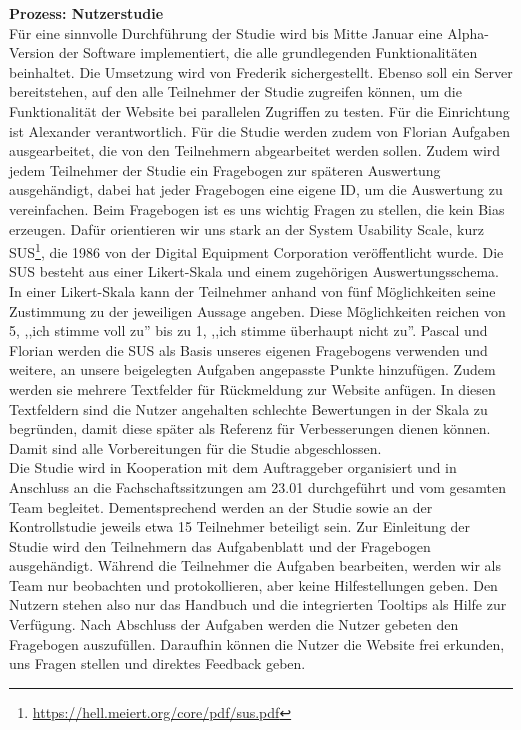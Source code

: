 \documentclass[accentcolor=tud0b,12pt,paper=a4]{tudreport}
\begin{document}
\noindent \textbf{Prozess: Nutzerstudie}\\
Für eine sinnvolle Durchführung der Studie wird bis Mitte Januar eine Alpha-Version der Software implementiert, die alle grundlegenden Funktionalitäten beinhaltet. Die Umsetzung wird von Frederik sichergestellt.
Ebenso soll ein Server bereitstehen, auf den alle Teilnehmer der Studie zugreifen können, um die Funktionalität der Website bei parallelen Zugriffen zu testen. Für die Einrichtung ist Alexander verantwortlich.
Für die Studie werden zudem von Florian Aufgaben ausgearbeitet, die von den Teilnehmern abgearbeitet werden sollen.
Zudem wird jedem Teilnehmer der Studie ein Fragebogen zur späteren Auswertung ausgehändigt, dabei hat jeder Fragebogen eine eigene ID, um die Auswertung zu vereinfachen.
Beim Fragebogen ist es uns wichtig Fragen zu stellen, die kein Bias erzeugen. Dafür orientieren wir uns stark an der System Usability Scale, kurz SUS\footnote{\url{https://hell.meiert.org/core/pdf/sus.pdf}}, die 1986 von der Digital Equipment Corporation veröffentlicht wurde.
Die SUS besteht aus einer Likert-Skala und einem zugehörigen Auswertungsschema. In einer Likert-Skala kann der Teilnehmer anhand von fünf Möglichkeiten seine Zustimmung zu der jeweiligen Aussage angeben.
Diese Möglichkeiten reichen von 5, ,,ich stimme voll zu'' bis zu 1, ,,ich stimme überhaupt nicht zu''.
Pascal und Florian werden die SUS als Basis unseres eigenen Fragebogens verwenden und weitere, an unsere beigelegten Aufgaben angepasste Punkte hinzufügen.
Zudem werden sie mehrere Textfelder für Rückmeldung zur Website anfügen.  In diesen Textfeldern sind die Nutzer angehalten schlechte Bewertungen in der Skala zu begründen, damit diese später als Referenz für Verbesserungen dienen können.
Damit sind alle Vorbereitungen für die Studie abgeschlossen.\\
Die Studie wird in Kooperation mit dem Auftraggeber organisiert und in Anschluss an die Fachschaftssitzungen am 23.01 durchgeführt und vom gesamten Team begleitet. Dementsprechend werden an der Studie sowie an der Kontrollstudie jeweils etwa 15 Teilnehmer beteiligt sein.
Zur Einleitung der Studie wird den Teilnehmern das Aufgabenblatt und der Fragebogen ausgehändigt.
Während die Teilnehmer die Aufgaben bearbeiten, werden wir als Team nur beobachten und protokollieren, aber keine Hilfestellungen geben.
Den Nutzern stehen also nur das Handbuch und die integrierten Tooltips als Hilfe zur Verfügung. Nach Abschluss der Aufgaben werden die Nutzer gebeten den Fragebogen auszufüllen. Daraufhin können die Nutzer die Website frei erkunden, uns Fragen stellen und direktes Feedback geben.
\end{document}
